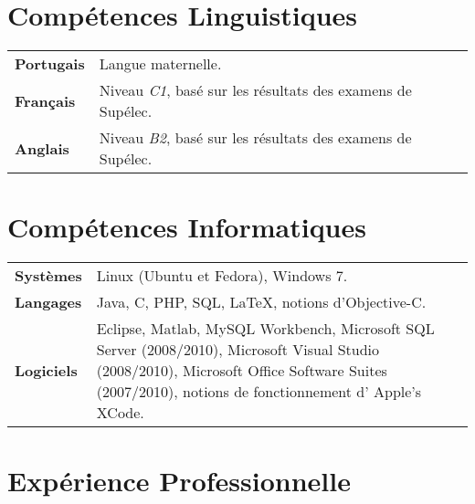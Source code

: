 \documentclass[10pt, a4paper]{article}
\begin{document}



\section{Compétences Linguistiques}

\begin{tabular}{p{} p{}}

\textbf{Portugais} & Langue maternelle.  \\ 

\textbf{Français} & Niveau \textit{C1}, basé sur les résultats des examens de
Supélec.\\

\textbf{Anglais} & Niveau \textit{B2}, basé sur les résultats des examens de
Supélec. \\  
\end{tabular}


\section{Compétences Informatiques}

\begin{tabular}{p{} p{}}

 \textbf{Systèmes} & Linux (Ubuntu et Fedora), Windows 7.  \\ 

 \textbf{Langages} & Java, C, PHP,  SQL, \LaTeX, notions d’Objective-C. \\ 
 
 \textbf{Logiciels} & Eclipse, Matlab, MySQL Workbench,  Microsoft SQL Server
 (2008/2010), Microsoft Visual Studio (2008/2010),  Microsoft Office Software
 Suites (2007/2010), notions de fonctionnement d’ Apple’s XCode. \\
\end{tabular}


\section{Expérience Professionnelle}
\end{document}
